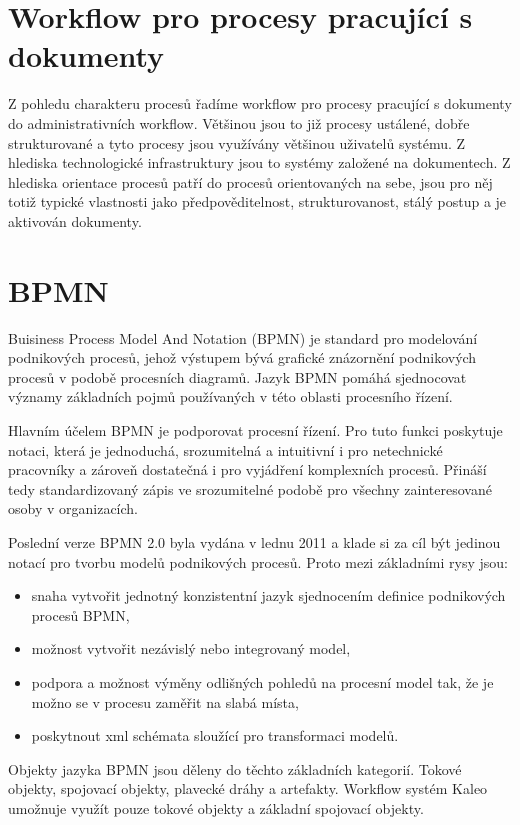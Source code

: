 \documentclass{fithesis}
\begin{document}
\section{Workflow pro procesy pracující s dokumenty}

Z pohledu charakteru procesů řadíme workflow pro procesy pracující s dokumenty do administrativních workflow. Většinou jsou to již procesy ustálené, dobře strukturované a tyto procesy jsou využívány většinou uživatelů systému. Z hlediska technologické infrastruktury jsou to systémy založené na dokumentech. Z hlediska orientace procesů patří do procesů orientovaných na sebe, jsou pro něj totiž typické vlastnosti jako předpověditelnost, strukturovanost, stálý postup a je aktivován dokumenty.






\section{BPMN}
Buisiness Process Model And Notation (BPMN) je standard pro modelování podnikových procesů, jehož výstupem bývá grafické znázornění podnikových procesů v podobě procesních diagramů. \cite{bpmn} Jazyk BPMN pomáhá sjednocovat významy základních pojmů používaných v této oblasti procesního řízení. 

Hlavním účelem BPMN je podporovat procesní řízení. Pro tuto funkci poskytuje notaci, která je jednoduchá, srozumitelná a intuitivní i pro netechnické pracovníky a zároveň dostatečná i pro vyjádření komplexních procesů. Přináší tedy standardizovaný zápis ve srozumitelné podobě pro všechny zainteresované osoby v organizacích.

Poslední verze BPMN 2.0 byla vydána v lednu 2011 a klade si za cíl být jedinou notací pro tvorbu modelů podnikových procesů. Proto mezi základními rysy jsou:
\begin{itemize}
\item snaha vytvořit jednotný konzistentní jazyk sjednocením definice podnikových procesů BPMN,
\item možnost vytvořit nezávislý nebo integrovaný model,
\item podpora a možnost výměny odlišných pohledů na procesní model tak, že je možno se v procesu zaměřit na slabá místa,
\item poskytnout xml schémata sloužící pro transformaci modelů.
\end{itemize}

Objekty jazyka BPMN jsou děleny do těchto základních kategorií. Tokové objekty, spojovací objekty, plavecké dráhy a artefakty. \cite{bpmn} Workflow systém Kaleo umožnuje využít pouze tokové objekty a základní spojovací objekty.
\end{document}
